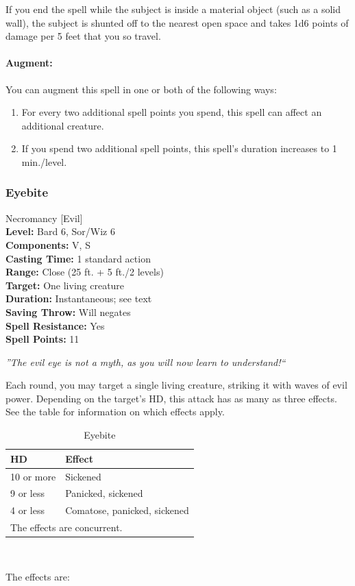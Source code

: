 If you end the spell while the subject is inside a material object (such as a solid wall), 
the subject is shunted off to the nearest open space and takes 1d6 points of damage per 5 feet that you so travel. 

\paragraph{Augment:} You can augment this spell in one or both of the following ways:
\begin{enumerate}
 \item For every two additional spell points you spend, this spell can affect an additional creature.
 \item If you spend two additional spell points, this spell's duration increases to 1 min./level.
\end{enumerate}
\subsubsection{Eyebite}
\label{Spell:Eyebite}
Necromancy [Evil]
\\ \textbf{Level:} Bard 6, Sor/Wiz 6
\\ \textbf{Components:} V, S
\\ \textbf{Casting Time:} 1 standard action
\\ \textbf{Range:} Close (25 ft. + 5 ft./2 levels)
\\ \textbf{Target:} One living creature
\\ \textbf{Duration:} Instantaneous; see text
\\ \textbf{Saving Throw:} Will negates
\\ \textbf{Spell Resistance:} Yes
\\ \textbf{Spell Points:} 11

\emph{''The evil eye is not a myth, as you will now learn to understand!``}

Each round, you may target a single living creature, striking it with waves of evil power.
Depending on the target's HD, this attack has as many as three effects. See the  table for information on which effects apply.

\begin{table}
\caption{Eyebite}
\label{tab:Eyebite}
\begin{center}
\begin{tabular}{|l|l|}
\hline
HD&Effect\\
\hline
10 or more&Sickened\\
9 or less&Panicked, sickened\\
4 or less&Comatose, panicked, sickened\\
\hline
\multicolumn{2}{l}{The effects are concurrent.}
\end{tabular}\\
\end{center}
\end{table}
The effects are:

